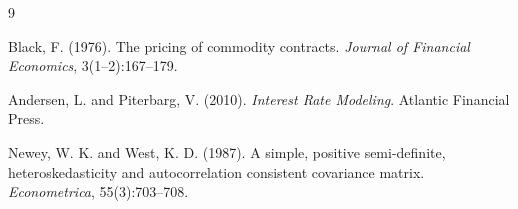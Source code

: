 \documentclass[12pt]{article}
\begin{document}
\begin{thebibliography}{9}

Black, F. (1976).
The pricing of commodity contracts.
\textit{Journal of Financial Economics}, 3(1--2):167--179.

Andersen, L. and Piterbarg, V. (2010).
\textit{Interest Rate Modeling}.
Atlantic Financial Press.

Newey, W. K. and West, K. D. (1987).
A simple, positive semi-definite, heteroskedasticity and autocorrelation consistent covariance
matrix.
\textit{Econometrica}, 55(3):703--708.

\end{thebibliography}
\end{document}
